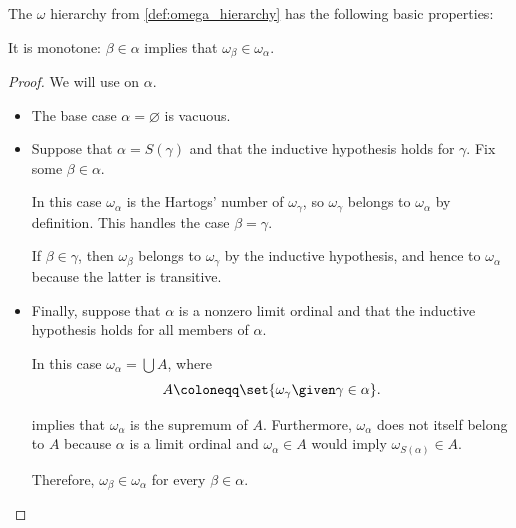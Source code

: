 \begin{proposition}\label{thm:def:omega_hierarchy}
  The \( \omega \) hierarchy from \cref{def:omega_hierarchy} has the following basic properties:
  \begin{thmenum}
     It is monotone: \( \beta \in \alpha \) implies that \( \omega_\beta \in \omega_\alpha \).
  \end{thmenum}
\end{proposition}
\begin{proof}
   We will use  on \( \alpha \).
  \begin{itemize}
    \item The base case \( \alpha = \varnothing \) is vacuous.
    \item Suppose that \( \alpha = S(\gamma) \) and that the inductive hypothesis holds for \( \gamma \). Fix some \( \beta \in \alpha \).

    In this case \( \omega_\alpha \) is the Hartogs' number of \( \omega_\gamma \), so \( \omega_\gamma \) belongs to \( \omega_\alpha \) by definition. This handles the case \( \beta = \gamma \).

    If \( \beta \in \gamma \), then \( \omega_\beta \) belongs to \( \omega_\gamma \) by the inductive hypothesis, and hence to \( \omega_\alpha \) because the latter is transitive.

    \item Finally, suppose that \( \alpha \) is a nonzero limit ordinal and that the inductive hypothesis holds for all members of \( \alpha \).

    In this case \( \omega_\alpha = \bigcup A \), where
    \begin{equation*}
      A \coloneqq \set{ \omega_\gamma \given \gamma \in \alpha }.
    \end{equation*}

     implies that \( \omega_\alpha \) is the supremum of \( A \). Furthermore, \( \omega_\alpha \) does not itself belong to \( A \) because \( \alpha \) is a limit ordinal and \( \omega_\alpha \in A \) would imply \( \omega_{S(\alpha)} \in A \).

    Therefore, \( \omega_\beta \in \omega_\alpha \) for every \( \beta \in \alpha \).
  \end{itemize}
\end{proof}

